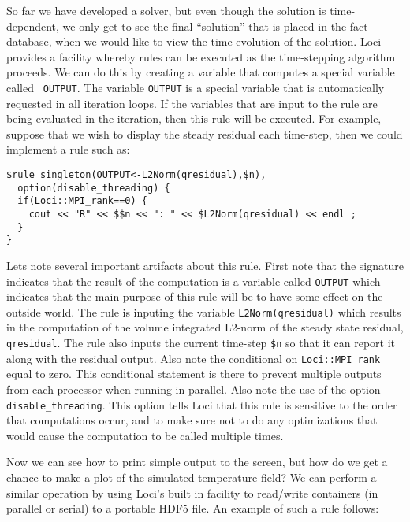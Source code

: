 \documentclass[10pt,epsf,letterpaper,twoside]{book}
\begin{document}
So far we have developed a solver, but even though the solution is
time-dependent, we only get to see the final ``solution'' that is
placed in the fact database, when we would like to view the time
evolution of the solution.  Loci provides a facility whereby rules can
be executed as the time-stepping algorithm proceeds.  We can do this
by creating a variable that computes a special variable called {\tt
  OUTPUT}.  The variable {\tt OUTPUT} is a special variable that is
automatically requested in all iteration loops.  If the variables that
are input to the rule are being evaluated in the iteration, then this
rule will be executed.  For example, suppose that we wish to display
the steady residual each time-step, then we could implement a rule such
as:
\begin{verbatim}
$rule singleton(OUTPUT<-L2Norm(qresidual),$n),
  option(disable_threading) {
  if(Loci::MPI_rank==0) {
    cout << "R" << $$n << ": " << $L2Norm(qresidual) << endl ;
  }
}
\end{verbatim}
Lets note several important artifacts about this rule.  First note
that the signature indicates that the result of the computation is a
variable called {\tt OUTPUT} which indicates that the main purpose of
this rule will be to have some effect on the outside world. The rule
is inputing the variable {\tt L2Norm(qresidual)} which results in the
computation of the volume integrated L2-norm of the steady state
residual, {\tt qresidual}.  The rule also inputs the current time-step
{\tt \$n} so that it can report it along with the residual output.
Also note the conditional on {\tt Loci::MPI\_rank} equal to zero.
This conditional statement is there to prevent multiple outputs from
each processor when running in parallel.  Also note the use of the
option {\tt disable\_threading}.  This option tells Loci that this
rule is sensitive to the order that computations occur, and to make
sure not to do any optimizations that would cause the computation to
be called multiple times.

Now we can see how to print simple output to the screen, but how do we
get a chance to make a plot of the simulated temperature field?  We
can perform a similar operation by using Loci's built in facility to
read/write containers (in parallel or serial) to a portable HDF5 file.
An example of such a rule follows:
\end{document}
